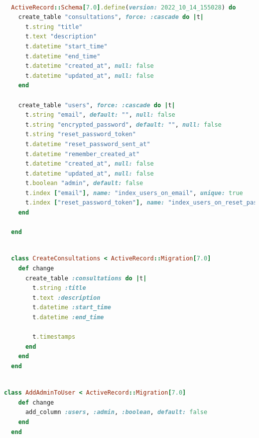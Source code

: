 \begin{lstlisting}[language=Ruby, caption=schema]

  ActiveRecord::Schema[7.0].define(version: 2022_10_14_155028) do
    create_table "consultations", force: :cascade do |t|
      t.string "title"
      t.text "description"
      t.datetime "start_time"
      t.datetime "end_time"
      t.datetime "created_at", null: false
      t.datetime "updated_at", null: false
    end

    create_table "users", force: :cascade do |t|
      t.string "email", default: "", null: false
      t.string "encrypted_password", default: "", null: false
      t.string "reset_password_token"
      t.datetime "reset_password_sent_at"
      t.datetime "remember_created_at"
      t.datetime "created_at", null: false
      t.datetime "updated_at", null: false
      t.boolean "admin", default: false
      t.index ["email"], name: "index_users_on_email", unique: true
      t.index ["reset_password_token"], name: "index_users_on_reset_password_token", unique: true
    end

  end

  \end{lstlisting}
\begin{lstlisting}[language=Ruby, caption=CreateConsultations]

  class CreateConsultations < ActiveRecord::Migration[7.0]
    def change
      create_table :consultations do |t|
        t.string :title
        t.text :description
        t.datetime :start_time
        t.datetime :end_time

        t.timestamps
      end
    end
  end



  \end{lstlisting}

  \begin{lstlisting}[language=Ruby, caption=AddAdminToUser]
  class AddAdminToUser < ActiveRecord::Migration[7.0]
    def change
      add_column :users, :admin, :boolean, default: false
    end
  end





  \end{lstlisting}

